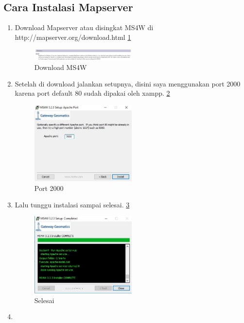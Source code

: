 \subsection{Cara Instalasi Mapserver}
\begin{enumerate}
\item
Download Mapserver atau disingkat MS4W di http://mapserver.org/download.html \ref{gambar1}
\begin{figure}[ht]
	    \centerline{\includegraphics[width=0.50\textwidth]{figures/gambar1.JPG}}
	    \caption{Download MS4W}
		\label{gambar1}
		\end{figure}
\item
Setelah di download jalankan setupnya, disini saya menggunakan port 2000 karena port default 80 sudah dipakai oleh xampp. \ref{gambar2}
\begin{figure}[ht]
	    \centerline{\includegraphics[width=0.50\textwidth]{figures/gambar2.JPG}}
	    \caption{Port 2000}
		\label{gambar2}
		\end{figure}
\item
Lalu tunggu instalasi sampai selesai. \ref{gambar3}
\begin{figure}[ht]
	    \centerline{\includegraphics[width=0.50\textwidth]{figures/gambar3.JPG}}
	    \caption{Selesai}
		\label{gambar3}
		\end{figure}
\item

\end{enumerate}
